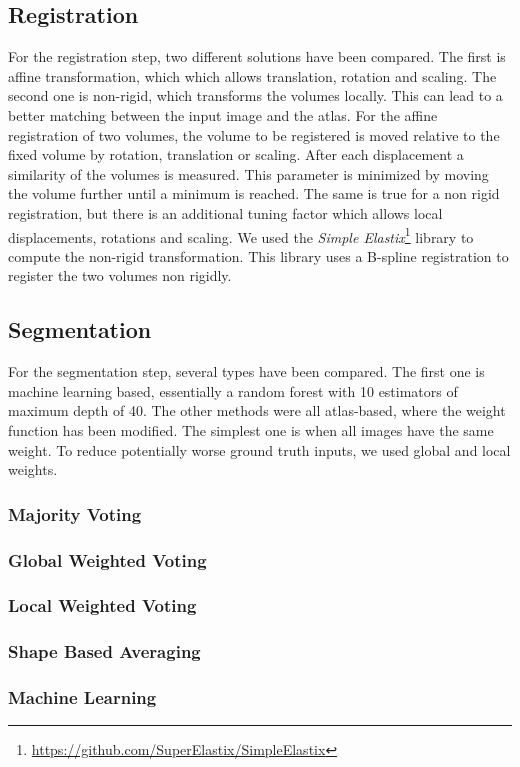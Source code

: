\subsection*{Registration}
For the registration step, two different solutions have been compared. The first is affine transformation, which which allows translation, rotation and scaling. The second one is non-rigid, which transforms the volumes locally. This can lead to a better matching between the input image and the atlas. For the affine registration of two volumes, the volume to be registered is moved relative to the fixed volume by rotation, translation or scaling. After each displacement a similarity of the volumes is measured. This parameter is minimized by moving the volume further until a minimum is reached. The same is true for a non rigid registration, but there is an additional tuning factor which allows local displacements, rotations and scaling. We used the \textit{Simple Elastix}\footnote{\url{https://github.com/SuperElastix/SimpleElastix}} library to compute the non-rigid transformation. This library uses a B-spline registration to register the two volumes non rigidly.

\subsection*{Segmentation}
For the segmentation step, several types have been compared. The first one is machine learning based, essentially a random forest with 10 estimators of maximum depth of 40. The other methods were all atlas-based, where the weight function has been modified. The simplest one is when all images have the same weight. To reduce potentially worse ground truth inputs, we used global and local weights.
\subsubsection*{Majority Voting}
\subsubsection*{Global Weighted Voting}
\subsubsection*{Local Weighted Voting}
\subsubsection*{Shape Based Averaging}
\subsubsection*{Machine Learning}